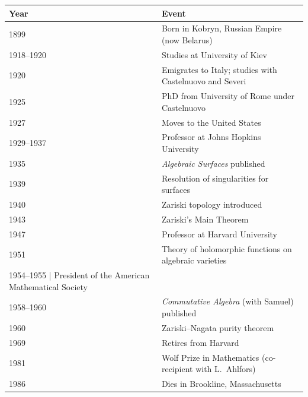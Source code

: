 \begin{tabularx}{\linewidth}{|p{1.5cm}|>{\raggedright\arraybackslash}X|}
\hline
\textbf{Year} & \textbf{Event} \\ \hline
1899 & Born in Kobryn, Russian Empire (now Belarus) \\ \hline
1918--1920 & Studies at University of Kiev \\ \hline
1920 & Emigrates to Italy; studies with Castelnuovo and Severi \\ \hline
1925 & PhD from University of Rome under Castelnuovo \\ \hline
1927 & Moves to the United States \\ \hline
1929--1937 & Professor at Johns Hopkins University \\ \hline
1935 & \textit{Algebraic Surfaces} published \\ \hline
1939 & Resolution of singularities for surfaces \\ \hline
1940 & Zariski topology introduced \\ \hline
1943 & Zariski's Main Theorem \\ \hline
1947 & Professor at Harvard University \\ \hline
1951 & Theory of holomorphic functions on algebraic varieties \\ \hline
1954--1955 | President of the American Mathematical Society \\ \hline
1958--1960 & \textit{Commutative Algebra} (with Samuel) published \\ \hline
1960 & Zariski--Nagata purity theorem \\ \hline
1969 & Retires from Harvard \\ \hline
1981 & Wolf Prize in Mathematics (co-recipient with L.\ Ahlfors) \\ \hline
1986 & Dies in Brookline, Massachusetts \\ \hline
\end{tabularx}
